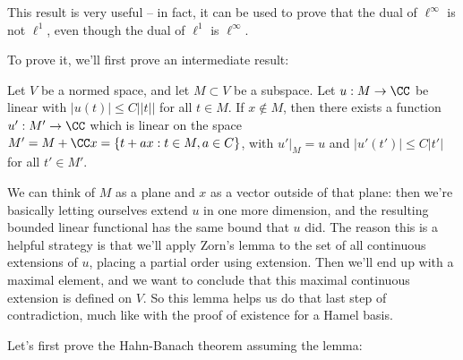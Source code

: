 This result is very useful -- in fact, it can be used to prove that the dual of $\ell^{\infty}$ is not $\ell^1$, even though the dual of $\ell^1$ is $\ell^{\infty}$.

To prove it, we'll first prove an intermediate result:

\begin{lemma}\label{hahnbanachlemma}
Let $V$ be a normed space, and let $M \subset V$ be a subspace. Let $u: M \to \CC$ be linear with $|u(t)| \le C||t||$ for all $t \in M$. If $x \not \in M$, then there exists a function $u': M' \to \CC$ which is linear on the space $M' = M + \CC x = \{t + ax: t \in M, a \in C\}$, with $u'|_M = u$ and  $|u'(t')| \le C |t'|$ for all $t' \in M'$.
\end{lemma}

We can think of $M$ as a plane and $x$ as a vector outside of that plane: then we're basically letting ourselves extend $u$ in one more dimension, and the resulting bounded linear functional has the same bound that $u$ did. The reason this is a helpful strategy is that we'll apply Zorn's lemma to the set of all continuous extensions of $u$, placing a partial order using extension. Then we'll end up with a maximal element, and we want to conclude that this maximal continuous extension is defined on $V$. So this lemma helps us do that last step of contradiction, much like with the proof of existence for a Hamel basis. 

Let's first prove the Hahn-Banach theorem assuming the lemma:

